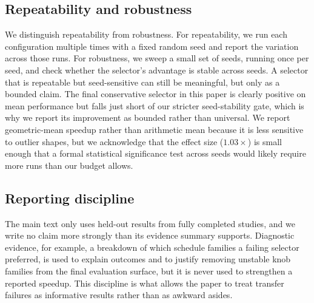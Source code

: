 \subsection{Repeatability and robustness}

We distinguish repeatability from robustness. For repeatability, we run each configuration multiple times with a fixed random seed and report the variation across those runs. For robustness, we sweep a small set of seeds, running once per seed, and check whether the selector's advantage is stable across seeds. A selector that is repeatable but seed-sensitive can still be meaningful, but only as a bounded claim. The final conservative selector in this paper is clearly positive on mean performance but falls just short of our stricter seed-stability gate, which is why we report its improvement as bounded rather than universal. We report geometric-mean speedup rather than arithmetic mean because it is less sensitive to outlier shapes, but we acknowledge that the effect size ($1.03\times$) is small enough that a formal statistical significance test across seeds would likely require more runs than our budget allows.

\subsection{Reporting discipline}

The main text only uses held-out results from fully completed studies, and we write no claim more strongly than its evidence summary supports. Diagnostic evidence, for example, a breakdown of which schedule families a failing selector preferred, is used to explain outcomes and to justify removing unstable knob families from the final evaluation surface, but it is never used to strengthen a reported speedup. This discipline is what allows the paper to treat transfer failures as informative results rather than as awkward asides.


